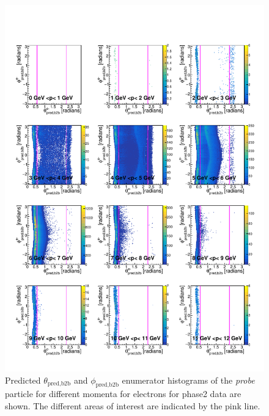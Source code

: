 \documentclass[a4paper,11pt,twosided,final,german,openbib,pdftex,listof=totoc,bibliography=totoc]{scrbook}
\begin{document}
\begin{appendix}
\begin{figure}[h!]
	\includegraphics[width=\textwidth]{Plots/master/RTPMemE_Data.pdf}
	\caption[Enumerator $\theta_{\textrm{pred,b2b}}$-$\phi_{\textrm{pred,b2b}}$ Electron Momentum Phase2 Data]{Predicted $\theta_{\textrm{pred,b2b}}$ and $\phi_{\textrm{pred,b2b}}$ enumerator histograms of the \textit{probe} particle for different momenta for electrons for phase2 data are shown. The different areas of interest are indicated by the pink line.}
	\label{plt:RTPMemE_Data}
\end{figure}




\end{appendix}
\end{document}
